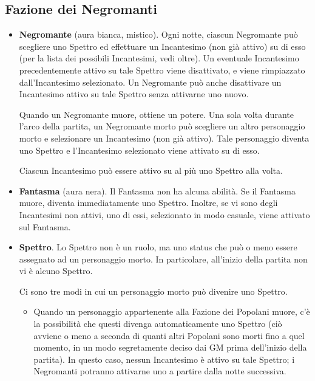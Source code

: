 \documentclass[a4paper,10pt]{article}
\begin{document}
\subsection*{Fazione dei Negromanti}
\label{negromanti}

\begin{itemize}

	\item {\bf Negromante} (aura bianca, mistico). Ogni notte, ciascun Negromante può scegliere uno Spettro ed effettuare un Incantesimo (non già attivo) su di esso (per la lista dei possibili Incantesimi, vedi oltre). Un eventuale Incantesimo precedentemente attivo su tale Spettro viene disattivato, e viene rimpiazzato dall'Incantesimo selezionato. Un Negromante può anche disattivare un Incantesimo attivo su tale Spettro senza attivarne uno nuovo.
	
	Quando un Negromante muore, ottiene un potere. Una sola volta durante l'arco della partita, un Negromante morto può scegliere un altro personaggio morto e selezionare un Incantesimo (non già attivo). Tale personaggio diventa uno Spettro e l'Incantesimo selezionato viene attivato su di esso.
	
	Ciascun Incantesimo può essere attivo su al più uno Spettro alla volta.
 
	\item {\bf Fantasma} (aura nera). Il Fantasma non ha alcuna abilità. Se il Fantasma muore, diventa immediatamente uno Spettro. Inoltre, se vi sono degli Incantesimi non attivi, uno di essi, selezionato in modo casuale, viene attivato sul Fantasma.

	\item {\bf Spettro}. Lo Spettro non è un ruolo, ma uno status che può o meno essere assegnato ad un personaggio morto. In particolare, all'inizio della partita non vi è alcuno Spettro.
	
	Ci sono tre modi in cui un personaggio morto può divenire uno Spettro.
	
	\begin{itemize}
		\item Quando un personaggio appartenente alla Fazione dei Popolani muore, c'è la possibilità che questi divenga automaticamente uno Spettro (ciò avviene o meno a seconda di quanti altri Popolani sono morti fino a quel momento, in un modo segretamente deciso dai GM prima dell'inizio della partita). In questo caso, nessun Incantesimo è attivo su tale Spettro; i Negromanti potranno attivarne uno a partire dalla notte successiva.
		

\end{itemize}
\end{itemize}
\end{document}
